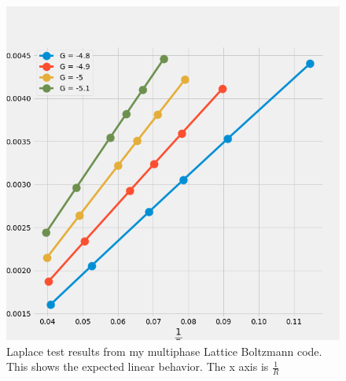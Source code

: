 \documentclass[]{article}
\begin{document}
\begin{figure}
	\centering
	\includegraphics[width=.8\linewidth]{figures/Laplace_test_multG.png}
	
	\caption{Laplace test results from my multiphase Lattice Boltzmann code. This shows the expected linear behavior. The x axis is $\frac{1}{R}$}
	\label{fig:laplace}
\end{figure}
\end{document}
